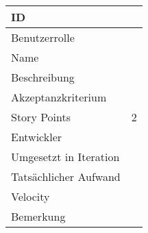 \begin{tabularx}{\textwidth}{|p{}|X|}
	\hline
	ID & \\
	\hline
	Benutzerrolle & \\
	\hline
	Name & \\
	\hline
	Beschreibung & \\
	\hline
	Akzeptanzkriterium & \\
	\hline
	Story Points & 2\\
	\hline
	Entwickler & \\
	\hline
	Umgesetzt in Iteration & \\ 
	\hline
	Tatsächlicher Aufwand & \\
	\hline
	Velocity & \\
	\hline
	Bemerkung & \\
	\hline
\end{tabularx}
\vspace{20pt}
